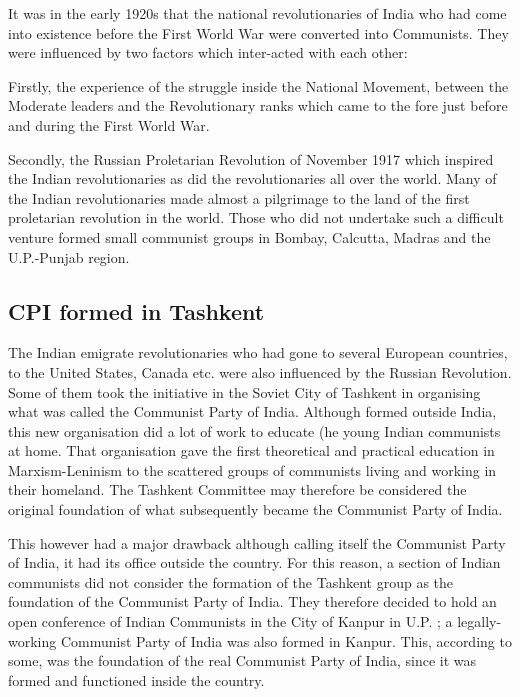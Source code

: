 

It was in the early 1920s that the national revolutionaries of India who had come into existence before the First World War were converted into Communists. They were influenced by two factors which inter-acted with each other: 

Firstly, the experience of the struggle inside the National Movement, between the Moderate leaders and the Revolutionary ranks which came to the fore just before and during the First World War. 

Secondly, the Russian Proletarian Revolution of November 1917 which inspired the Indian revolutionaries as did the revolutionaries all over the world. Many of the Indian revolutionaries made almost a pilgrimage to the land of the first proletarian revolution in the world. Those who did not undertake such a difficult venture formed small communist groups in Bombay, Calcutta, Madras and the U.P.-Punjab region.\\ 

\subsection{CPI formed in Tashkent}

The Indian emigrate revolutionaries who had gone to several European countries, to the United States, Canada etc. were also influenced by the Russian Revolution. Some of them took the initiative in the Soviet City of Tashkent in organising what was called the Communist Party of India. Although formed outside India, this new organisation did a lot of work to educate (he young Indian communists at home. That organisation gave the first theoretical and practical education in Marxism-Leninism to the scattered groups of communists living and working in their homeland. The Tashkent Committee may therefore be considered the original foundation of what subsequently became the Communist Party of India. 

This however had a major drawback  although calling itself the Communist Party of India, it had its office outside the country. For this reason, a section of Indian communists did not consider the formation of the Tashkent group as the foundation of the Communist Party of India. They therefore decided to hold an open conference of Indian Communists in the City of Kanpur in U.P. ; a legally-working Communist Party of India was also formed in Kanpur. This, according to some, was the foundation of the real Communist Party of India, since it was formed and functioned inside the country. 

